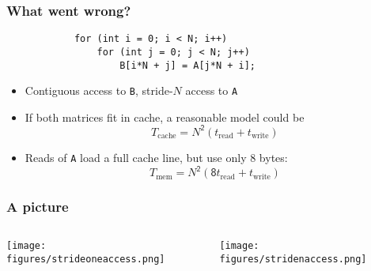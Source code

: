 \documentclass[dvipsnames,presentation,aspectratio=169,14pt]{beamer}
\begin{document}
\begin{frame}[fragile]
  \frametitle{What went wrong?}

  \begin{center}
\begin{verbatim}
            for (int i = 0; i < N; i++)
                for (int j = 0; j < N; j++)
                    B[i*N + j] = A[j*N + i];
\end{verbatim}
    \vskip 5pt

  \end{center}
  \begin{itemize}[itemsep=8pt]
  \item Contiguous access to \texttt{B}, stride-$N$ access to \texttt{A}

  \item If both matrices fit in cache, a reasonable model could be
    \begin{equation*}
    T_{\text{cache}} = N^{\mathsf{2}}(t_\text{read} + t_\text{write})
  \end{equation*}

  \item Reads of \texttt{A} load a full cache line, but use only 8 bytes:
    \begin{equation*}
       T_\text{mem} = N^{\mathsf 2}(\mathsf 8 t_\text{read} + t_\text{write})
    \end{equation*}
  \end{itemize}
\end{frame}

\begin{frame}
  \frametitle{A picture}
  \vskip -20pt
  \begin{columns}
    \begin{column}{0.45\textwidth}
      \begin{center}
        \texttt{[image: figures/strideoneaccess.png]}
      \end{center}
    \end{column}
    \begin{column}{0.45\textwidth}
      \begin{center}
        \texttt{[image: figures/stridenaccess.png]}
      \end{center}
    \end{column}
  \end{columns}
\end{frame}
\end{document}
